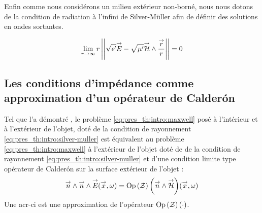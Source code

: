 Enfin comme nous considérons un milieu extérieur non-borné, nous nous dotons de la condition de radiation à l'infini de Silver-Müller afin de définir des solutions en ondes sortantes.


\begin{equation}
\label{eq:pres_th:intro:silver-muller}
\lim_{r\rightarrow\infty} r \left|\left|\sqrt{\epsilon'}{\overset{\rightarrow}{E}} - \sqrt{\mu'}{\overset{\rightarrow}{\mathcal{H}}}\wedge\dfrac{{\overset{\rightarrow}{r}}}{r}\right|\right| = 0
\end{equation} 

\subsection*{Les conditions d'impédance comme approximation d'un opérateur de Calderón}

Tel que l'a démontré \cite[p.~109]{cessenat_mathematical_1996}, le problème \eqref{eq:pres_th:intro:maxwell}  posé à l'intérieur et à l'extérieur de l'objet, doté de la condition de rayonnement \eqref{eq:pres_th:intro:silver-muller} est équivalent au problème \eqref{eq:pres_th:intro:maxwell} à l'extérieur de l'objet doté de de la condition de rayonnement \eqref{eq:pres_th:intro:silver-muller} et d'une condition limite type opérateur de Calderón sur la surface extérieur de l'objet : 
\begin{equation}
\label{eq:pres_th:ci:ci-calderon}
{\overset{\rightarrow}{n}} \wedge {\overset{\rightarrow}{n}} \wedge {\overset{\rightarrow}{E}} ({\overset{\rightarrow}{x}} , \omega ) = {\operatorname{Op}\left(\mathcal Z\right)\left({\overset{\rightarrow}{n}} \wedge {\overset{\rightarrow}{\mathcal{H}}} \right)}({\overset{\rightarrow}{x}}, \omega )
\end{equation}
Une \gls{acr-ci} est une approximation de l'opérateur \({\operatorname{Op}\left(\mathcal Z\right)\left(\cdot\right)}\).






